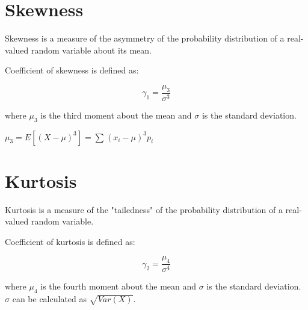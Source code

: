 \documentclass[english,course]{lecture}
\begin{document}
\section{Skewness}

Skewness is a measure of the asymmetry of the probability distribution of a real-valued random variable about its mean.

Coefficient of skewness is defined as:

$$\gamma_1 = \displaystyle\frac{\mu_3}{\sigma^3}$$

where $\mu_3$ is the third moment about the mean and $\sigma$ is the standard deviation.

$\mu_3 = E[(X - \mu)^3] = \sum_{}^{}(x_i - \mu)^3 p_i$

\section{Kurtosis}

Kurtosis is a measure of the "tailedness" of the probability distribution of a real-valued random variable.

Coefficient of kurtosis is defined as:

$$\gamma_2 = \displaystyle\frac{\mu_4}{\sigma^4}$$

where $\mu_4$ is the fourth moment about the mean and $\sigma$ is the standard deviation.
$\sigma$ can be calculated as $\sqrt{Var(X)}$.
\end{document}
